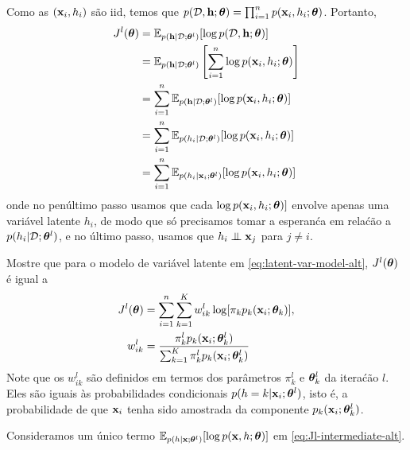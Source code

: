 \begin{exenumerate}
    \begin{solution}
        Como as $(\mathbf{x}_i, h_i)$ s\~ao iid, temos que $p(\mathcal{D},\mathbf{h}; \boldsymbol{\theta}) =
        \prod_{i=1}^n p(\mathbf{x}_i, h_i; \boldsymbol{\theta})$. Portanto,
        \begin{align}
            J^l(\boldsymbol{\theta}) &= \mathbb{E}_{p(\mathbf{h} | \mathcal{D}; \boldsymbol{\theta}^l)} [ \log p(\mathcal{D},\mathbf{h}; \boldsymbol{\theta})]\\
            & = \mathbb{E}_{p(\mathbf{h} | \mathcal{D}; \boldsymbol{\theta}^l)}\left[ \sum_{i=1}^n \log  p(\mathbf{x}_i, h_i; \boldsymbol{\theta})\right]\\
            & = \sum_{i=1}^n \mathbb{E}_{p(\mathbf{h} | \mathcal{D}; \boldsymbol{\theta}^l)}[ \log  p(\mathbf{x}_i, h_i; \boldsymbol{\theta})]\\
            & =  \sum_{i=1}^n \mathbb{E}_{p(h_i | \mathcal{D}; \boldsymbol{\theta}^l)}[ \log  p(\mathbf{x}_i, h_i; \boldsymbol{\theta})]\\
            & =  \sum_{i=1}^n \mathbb{E}_{p(h_i | \mathbf{x}_i; \boldsymbol{\theta}^l)}[ \log  p(\mathbf{x}_i, h_i; \boldsymbol{\theta})] \label{eq:Jl-intermediate-alt}
        \end{align}
        onde no pen\'ultimo passo usamos que cada $\log p(\mathbf{x}_i, h_i;
        \boldsymbol{\theta})]$ envolve apenas uma vari\'avel latente $h_i$, de modo que s\'o precisamos
        tomar a esperan\'ca em rela\'c\~ao a $p(h_i | \mathcal{D}; \boldsymbol{\theta}^l)$, e no \'ultimo passo,
        usamos que $h_i \mathrel{\perp\mspace{-10mu}\perp} \mathbf{x}_j$ para $j \neq i$.
        
    \end{solution}
    
    \item Mostre que para o modelo de vari\'avel latente em \eqref{eq:latent-var-model-alt},
    $J^l(\boldsymbol{\theta})$ \'e igual a
    \begin{align}
        J^l(\boldsymbol{\theta}) & = \sum_{i=1}^n  \sum_{k=1}^K w_{ik}^l  \log[  \pi_k  p_k(\mathbf{x}_i; \boldsymbol{\theta}_k) ],\label{eq:Jl-expression-alt}\\
        w_{ik}^l & =  \frac{ \pi^l_k p_k(\mathbf{x}_i; \boldsymbol{\theta}^l_k)}{ \sum_{k=1}^K \pi^l_k p_k(\mathbf{x}_i; \boldsymbol{\theta}^l_k)}\label{eq:w-def-alt}
    \end{align}
    Note que os $w_{ik}^l$ s\~ao definidos em termos dos par\^ametros $\pi_k^l$ e
    $\boldsymbol{\theta}_k^l$ da itera\'c\~ao $l$. Eles s\~ao iguais \`as probabilidades condicionais
    $p(h=k|\mathbf{x}_i; \boldsymbol{\theta}^l)$, isto \'e, a probabilidade de que $\mathbf{x}_i$
    tenha sido amostrada da componente $p_k(\mathbf{x}_i; \boldsymbol{\theta}^l_k)$. 
    
    \begin{solution}
        Consideramos um \'unico termo $ \mathbb{E}_{p(h| \mathbf{x}; \boldsymbol{\theta}^l)}[ \log p(\mathbf{x}, h;
        \boldsymbol{\theta})]$ em \eqref{eq:Jl-intermediate-alt}.
        

\end{solution}
\end{exenumerate}
